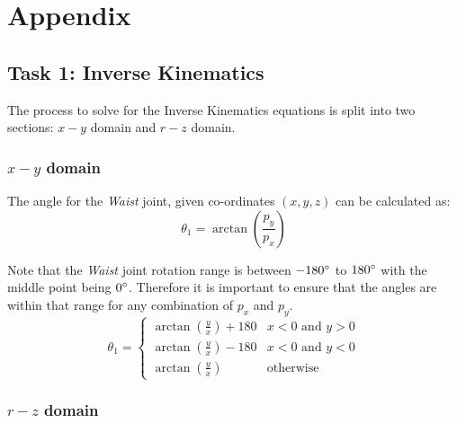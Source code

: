 \documentclass[9pt, a4paper]{article}
\begin{document}
\pagebreak
\section{Appendix}
\subsection{Task 1: Inverse Kinematics}

The process to solve for the Inverse Kinematics equations is split into two
sections: $x-y$ domain and $r-z$ domain.

\subsubsection{$x-y$ domain}

The angle for the \textit{Waist} joint, given co-ordinates $(x, y, z)$ can be calculated as:
$$
  \theta_1 = \arctan \left(\frac{p_y}{p_x}\right)
$$

Note that the \textit{Waist} joint rotation range is between $-180\degree$ to
$180\degree$ with the middle point being $0\degree$. Therefore it is important
to ensure that the angles are within that range for any combination of $p_x$ and
$p_y$.
$$
\theta_1 = \begin{cases} 
  \arctan(\frac{y}{x}) + 180 & x < 0 \text{ and } y > 0 \\ 
  \arctan(\frac{y}{x}) - 180 & x < 0 \text{ and } y < 0 \\
  \arctan(\frac{y}{x}) & \text{otherwise}
\end{cases}
$$

\subsubsection{$r-z$ domain}
\end{document}
